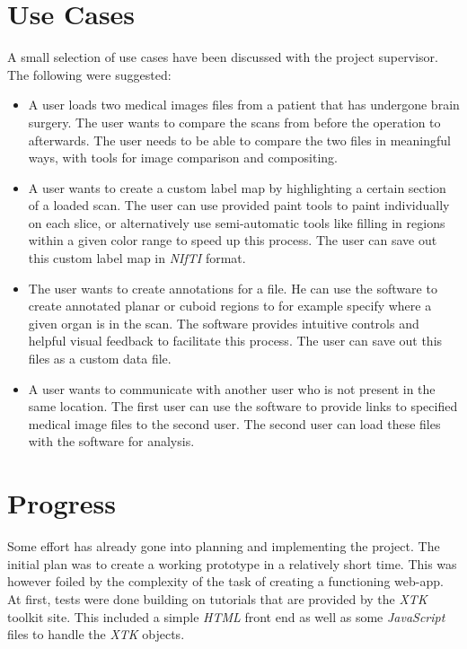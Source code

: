 \documentclass[a4paper,11pt,titlepage]{article}
\begin{document}
\section{Use Cases}

A small selection of use cases have been discussed with the project supervisor. The following were suggested:

\begin{itemize}

\item A user loads two medical images files from a patient that has undergone brain surgery. The user wants to compare the scans from before the operation to afterwards. The user needs to be able to compare the two files in meaningful ways, with tools for image comparison and compositing.

\item A user wants to create a custom label map by highlighting a certain section of a loaded scan. The user can use provided paint tools to paint individually on each slice, or alternatively use semi-automatic tools like filling in regions within a given color range to speed up this process. The user can save out this custom label map in \textit{NIfTI} format.

\item The user wants to create annotations for a file. He can use the software to create annotated planar or cuboid regions to for example specify where a given organ is in the scan. The software provides intuitive controls and helpful visual feedback to facilitate this process. The user can save out this files as a custom data file.

\item A user wants to communicate with another user who is not present in the same location. The first user can use the software to provide links to specified medical image files to the second user. The second user can load these files with the software for analysis.

\end{itemize}

\section{Progress}

Some effort has already gone into planning and implementing the project. The initial plan was to create a working prototype in a relatively short time. This was however foiled by the complexity of the task of creating a functioning web-app. At first, tests were done building on tutorials that are provided by the \textit{XTK} toolkit site. This included a simple \textit{HTML} front end as well as some \textit{JavaScript} files to handle the \textit{XTK} objects.
\end{document}
